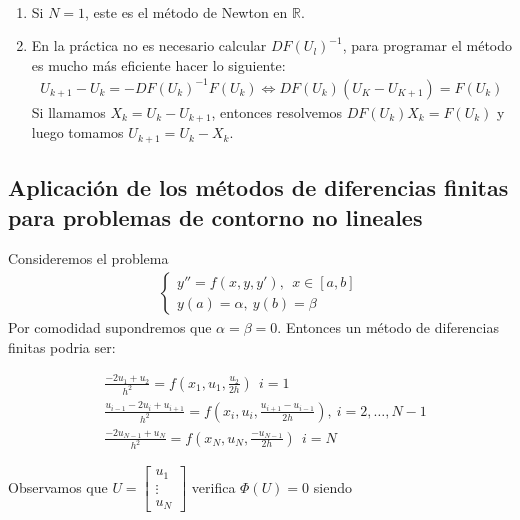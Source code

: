 \begin{obs} \
\begin{enumerate}
    \item Si $N = 1$, este es el método de Newton en $\mathbb{R}$.
    \item En la práctica no es necesario calcular $DF(U_l)^{-1}$, para programar el método es mucho más eficiente hacer lo siguiente:
    \begin{align*}
        U_{k+1} -U_k = -DF(U_k)^{-1}F(U_k) \Longleftrightarrow DF(U_k)(U_K - U_{K+1}) = F(U_k)
    \end{align*}
    Si llamamos $X_k = U_k - U_{k+1}$, entonces resolvemos $DF(U_k)X_k = F(U_k)$ y luego tomamos $U_{k+1} = U_k - X_k$.
\end{enumerate}
\end{obs}

\subsection{Aplicación de los métodos de diferencias finitas para problemas de contorno no lineales}

\noindent Consideremos el problema
\begin{align*}
        \left\{ \begin{array}{lcc}
             y'' = f(x,y,y'), \ \ x \in [a,b]\\
             y(a) = \alpha, \ y(b) = \beta
             \end{array}
   \right.
\end{align*}
Por comodidad supondremos que $\alpha = \beta = 0$. Entonces un método de diferencias finitas podria ser:

\begin{align*}
    & \frac{-2u_1 + u_2}{h^2} = f\left( x_1,u_1, \frac{u_2}{2h} \right)\ \ i = 1 \\
    & \frac{u_{i-1} - 2u_i + u_{i+1}}{h^2} = f\left(x_i, u_i, \frac{u_{i+1} -u_{i-1}}{2h} \right), \ i = 2,\ldots,N-1 \\
    & \frac{-2u_{N-1} + u_N}{h^2} = f\left( x_N,u_N, \frac{-u_{N-1  }}{2h} \right) \ \ i = N
\end{align*}

Observamos que $U = \begin{bmatrix}
u_1\\
\vdots\\
u_N
\end{bmatrix}$ verifica $\Phi(U) = 0$ siendo


